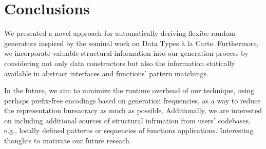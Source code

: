 \section{Conclusions}
\label{sec:conclusions}

We presented a novel approach for automatically deriving flexibe random
generators inspired by the seminal work on Data Types \`a la Carte.
%
Furthermore, we incorporate valuable structural information into our generation
process by considering not only data constructors but also the information
statically available in abstract interfaces and functions' pattern matchings.


In the future, we aim to minimize the runtime overhead of our technique, using
perhaps prefix-free encodings based on generation frequencies, as a way to
reduce the representation bureacracy as much as possible.
%
Additionally, we are interested on including additional sources of structural
infrmation from users' codebases, e.g., locally defined patterns or sequencies
of functions applications.
%
Interesting thoughts to motivate our future reseach.
